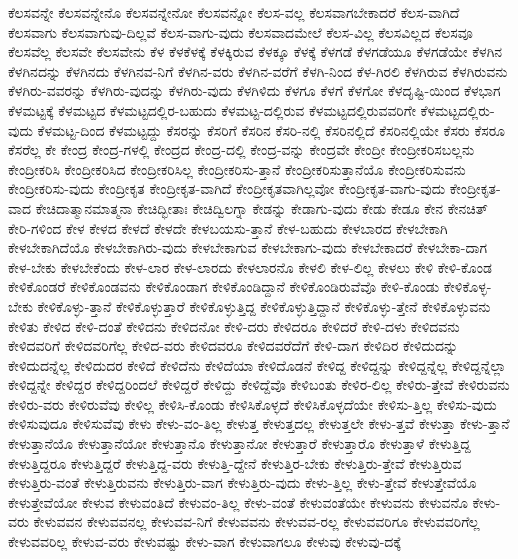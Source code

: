 {ಕೆಲಸವನ್ನೇ
ಕೆಲಸವನ್ನೇನೊ
ಕೆಲಸವನ್ನೇನೋ
ಕೆಲಸವನ್ನೋ
ಕೆಲಸ-ವಲ್ಲ
ಕೆಲಸವಾಗಬೇಕಾದರೆ
ಕೆಲಸ-ವಾಗಿದೆ
ಕೆಲಸವಾಗು
ಕೆಲಸವಾಗುವು-ದಿಲ್ಲವೆ
ಕೆಲಸ-ವಾಗು-ವುದು
ಕೆಲಸವಾದಮೇಲೆ
ಕೆಲಸ-ವಿಲ್ಲ
ಕೆಲಸವಿಲ್ಲದ
ಕೆಲಸವೂ
ಕೆಲಸವೆಲ್ಲ
ಕೆಲಸವೇ
ಕೆಲಸವೇನು
ಕೆಳ
ಕೆಳಕೆಳಕ್ಕೆ
ಕೆಳಕ್ಕಿರುವ
ಕೆಳಕ್ಕೂ
ಕೆಳಕ್ಕೆ
ಕೆಳಗಡೆ
ಕೆಳಗಡೆಯೂ
ಕೆಳಗಡೆಯೇ
ಕೆಳಗಿನ
ಕೆಳಗಿನದನ್ನು
ಕೆಳಗಿನದು
ಕೆಳಗಿನವ-ನಿಗೆ
ಕೆಳಗಿನ-ವರು
ಕೆಳಗಿನ-ವರೆಗೆ
ಕೆಳಗಿ-ನಿಂದ
ಕೆಳ-ಗಿರಲಿ
ಕೆಳಗಿರುವ
ಕೆಳಗಿರುವನು
ಕೆಳಗಿರು-ವವರನ್ನು
ಕೆಳಗಿರು-ವುದನ್ನು
ಕೆಳಗಿರು-ವುದು
ಕೆಳಗಿಳಿದು
ಕೆಳಗೂ
ಕೆಳಗೆ
ಕೆಳಗೋ
ಕೆಳದೃಷ್ಟಿ-ಯಿಂದ
ಕೆಳಭಾಗ
ಕೆಳಮಟ್ಟಕ್ಕೆ
ಕೆಳಮಟ್ಟದ
ಕೆಳಮಟ್ಟದಲ್ಲಿರ-ಬಹುದು
ಕೆಳಮಟ್ಟ-ದಲ್ಲಿರುವ
ಕೆಳಮಟ್ಟದಲ್ಲಿರುವವರಿಗೇ
ಕೆಳಮಟ್ಟದಲ್ಲಿರು-ವುದು
ಕೆಳಮಟ್ಟ-ದಿಂದ
ಕೆಳಮಟ್ಟದ್ದು
ಕೆಸರನ್ನು
ಕೆಸರಿಗೆ
ಕೆಸರಿನ
ಕೆಸರಿ-ನಲ್ಲಿ
ಕೆಸರಿನಲ್ಲಿದೆ
ಕೆಸರಿನಲ್ಲಿಯೇ
ಕೆಸರು
ಕೆಸರೂ
ಕೆಸರೆಲ್ಲ
ಕೇ
ಕೇಂದ್ರ
ಕೇಂದ್ರ-ಗಳಲ್ಲಿ
ಕೇಂದ್ರದ
ಕೇಂದ್ರ-ದಲ್ಲಿ
ಕೇಂದ್ರ-ವನ್ನು
ಕೇಂದ್ರವೇ
ಕೇಂದ್ರೀ
ಕೇಂದ್ರೀಕರಿಸಬಲ್ಲನು
ಕೇಂದ್ರೀಕರಿಸಿ
ಕೇಂದ್ರೀಕರಿಸಿದ
ಕೇಂದ್ರೀಕರಿಸಿಲ್ಲ
ಕೇಂದ್ರೀಕರಿಸು-ತ್ತಾನೆ
ಕೇಂದ್ರೀಕರಿಸುತ್ತಾನೆಯೊ
ಕೇಂದ್ರೀಕರಿಸುವನು
ಕೇಂದ್ರೀಕರಿಸು-ವುದು
ಕೇಂದ್ರೀಕೃತ
ಕೇಂದ್ರೀಕೃತ-ವಾಗಿದೆ
ಕೇಂದ್ರೀಕೃತವಾಗಿಲ್ಲವೋ
ಕೇಂದ್ರೀಕೃತ-ವಾಗು-ವುದು
ಕೇಂದ್ರೀಕೃತ-ವಾದ
ಕೇಚಿದಾತ್ಮಾನಮಾತ್ಮನಾ
ಕೇಚಿದ್ಭೀತಾಃ
ಕೇಚಿದ್ವಿಲಗ್ನಾ
ಕೇಡನ್ನು
ಕೇಡಾಗು-ವುದು
ಕೇಡು
ಕೇಡೂ
ಕೇನ
ಕೇನಚಿತ್
ಕೇರಿ-ಗಳಿಂದ
ಕೇಳ
ಕೇಳದ
ಕೇಳದೆ
ಕೇಳದೇ
ಕೇಳಬಯಸು-ತ್ತಾನೆ
ಕೇಳ-ಬಹುದು
ಕೇಳಬಾರದ
ಕೇಳಬೇಕಾಗಿ
ಕೇಳಬೇಕಾಗಿದೆಯೊ
ಕೇಳಬೇಕಾಗಿರು-ವುದು
ಕೇಳಬೇಕಾಗುವ
ಕೇಳಬೇಕಾಗು-ವುದು
ಕೇಳಬೇಕಾದರೆ
ಕೇಳಬೇಕಾ-ದಾಗ
ಕೇಳ-ಬೇಕು
ಕೇಳಬೇಕೆಂದು
ಕೇಳ-ಲಾರ
ಕೇಳ-ಲಾರದು
ಕೇಳಲಾರನೊ
ಕೇಳಲಿ
ಕೇಳ-ಲಿಲ್ಲ
ಕೇಳಲು
ಕೇಳಿ
ಕೇಳಿ-ಕೊಂಡ
ಕೇಳಿಕೊಂಡರೆ
ಕೇಳಿಕೊಂಡವನು
ಕೇಳಿಕೊಂಡಾಗ
ಕೇಳಿಕೊಂಡಿದ್ದಾನೆ
ಕೇಳಿಕೊಂಡಿರುವೆವೊ
ಕೇಳಿ-ಕೊಂಡು
ಕೇಳಿಕೊಳ್ಳ-ಬೇಕು
ಕೇಳಿಕೊಳ್ಳು-ತ್ತಾನೆ
ಕೇಳಿಕೊಳ್ಳುತ್ತಾರೆ
ಕೇಳಿಕೊಳ್ಳುತ್ತಿದ್ದ
ಕೇಳಿಕೊಳ್ಳುತ್ತಿದ್ದಾನೆ
ಕೇಳಿಕೊಳ್ಳು-ತ್ತೇನೆ
ಕೇಳಿಕೊಳ್ಳುವನು
ಕೇಳಿತು
ಕೇಳಿದ
ಕೇಳಿ-ದಂತೆ
ಕೇಳಿದನು
ಕೇಳಿದನೋ
ಕೇಳಿ-ದರು
ಕೇಳಿದರೂ
ಕೇಳಿದರೆ
ಕೇಳಿ-ದಳು
ಕೇಳಿದವನು
ಕೇಳಿದವರಿಗೆ
ಕೇಳಿದವರಿಗೆಲ್ಲ
ಕೇಳಿದ-ವರು
ಕೇಳಿದವರೂ
ಕೇಳಿದವರೆದೆಗೆ
ಕೇಳಿ-ದಾಗ
ಕೇಳಿದಿರ
ಕೇಳಿದುದನ್ನು
ಕೇಳಿದುದನ್ನೆಲ್ಲ
ಕೇಳಿದುದರ
ಕೇಳಿದೆ
ಕೇಳಿದೆನು
ಕೇಳಿದೆಯಾ
ಕೇಳಿದೊಡನೆ
ಕೇಳಿದ್ದ
ಕೇಳಿದ್ದನ್ನು
ಕೇಳಿದ್ದನ್ನೆಲ್ಲ
ಕೇಳಿದ್ದನ್ನೆಲ್ಲಾ
ಕೇಳಿದ್ದನ್ನೇ
ಕೇಳಿದ್ದರ
ಕೇಳಿದ್ದರಿಂದಲೆ
ಕೇಳಿದ್ದರೆ
ಕೇಳಿದ್ದು
ಕೇಳಿದ್ದೆವೊ
ಕೇಳಿಬಂತು
ಕೇಳಿರ-ಲಿಲ್ಲ
ಕೇಳಿರು-ತ್ತೇವೆ
ಕೇಳಿರುವನು
ಕೇಳಿರು-ವರು
ಕೇಳಿರುವೆವು
ಕೇಳಿಲ್ಲ
ಕೇಳಿಸಿ-ಕೊಂಡು
ಕೇಳಿಸಿಕೊಳ್ಳದೆ
ಕೇಳಿಸಿಕೊಳ್ಳದೆಯೇ
ಕೇಳಿಸು-ತ್ತಿಲ್ಲ
ಕೇಳಿಸು-ವುದು
ಕೇಳಿಸುವುದೂ
ಕೇಳಿಸುವೆವು
ಕೇಳು
ಕೇಳು-ವಂ-ತಿಲ್ಲ
ಕೇಳುತ್ತ
ಕೇಳುತ್ತದಲ್ಲ
ಕೇಳುತ್ತಲೇ
ಕೇಳು-ತ್ತವೆ
ಕೇಳುತ್ತಾ
ಕೇಳು-ತ್ತಾನೆ
ಕೇಳುತ್ತಾನೆಯೊ
ಕೇಳುತ್ತಾನೆಯೋ
ಕೇಳುತ್ತಾನೊ
ಕೇಳುತ್ತಾನೋ
ಕೇಳುತ್ತಾರೆ
ಕೇಳುತ್ತಾರೊ
ಕೇಳುತ್ತಾಳೆ
ಕೇಳುತ್ತಿದ್ದ
ಕೇಳುತ್ತಿದ್ದರೂ
ಕೇಳುತ್ತಿದ್ದರೆ
ಕೇಳುತ್ತಿದ್ದ-ವರು
ಕೇಳುತ್ತಿ-ದ್ದೇನೆ
ಕೇಳುತ್ತಿರ-ಬೇಕು
ಕೇಳುತ್ತಿರು-ತ್ತೇವೆ
ಕೇಳುತ್ತಿರುವ
ಕೇಳುತ್ತಿರು-ವಂತೆ
ಕೇಳುತ್ತಿರುವನು
ಕೇಳುತ್ತಿರು-ವಾಗ
ಕೇಳುತ್ತಿರು-ವುದು
ಕೇಳು-ತ್ತಿಲ್ಲ
ಕೇಳು-ತ್ತೇವೆ
ಕೇಳುತ್ತೇವೆಯೊ
ಕೇಳುತ್ತೇವೆಯೋ
ಕೇಳುವ
ಕೇಳುವಂತಿದೆ
ಕೇಳುವಂ-ತಿಲ್ಲ
ಕೇಳು-ವಂತೆ
ಕೇಳುವಂತೆಯೇ
ಕೇಳುವನು
ಕೇಳುವನೊ
ಕೇಳು-ವರು
ಕೇಳುವವನ
ಕೇಳುವವನಲ್ಲ
ಕೇಳುವವ-ನಿಗೆ
ಕೇಳುವವನು
ಕೇಳುವವ-ರಲ್ಲ
ಕೇಳುವವರಿಗೂ
ಕೇಳುವವರಿಗೆಲ್ಲ
ಕೇಳುವವರಿಲ್ಲ
ಕೇಳುವ-ವರು
ಕೇಳುವಷ್ಟು
ಕೇಳು-ವಾಗ
ಕೇಳುವಾಗಲೂ
ಕೇಳುವು
ಕೇಳುವು-ದಕ್ಕೆ
}
